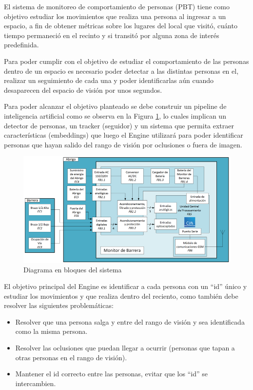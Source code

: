 \documentclass[11pt]{charter}
\begin{document}
El sistema de monitoreo de comportamiento de personas (PBT) tiene como objetivo estudiar los movimientos que realiza una persona al ingresar a un espacio, a fin de obtener métricas sobre los lugares del local que visitó, cuánto tiempo permaneció en el recinto y si transitó por alguna zona de interés predefinida.

Para poder cumplir con el objetivo de estudiar el comportamiento de las personas dentro de un espacio es necesario poder detectar a las distintas personas en el, realizar un seguimiento de cada una y poder identificarlas aún cuando desaparecen del espacio de visión por unos segundos.

Para poder alcanzar el objetivo planteado se debe construir un pipeline de inteligencia artificial como se observa en la Figura \ref{fig:diagBloques}, lo cuales implican un detector de personas, un tracker (seguidor) y un sistema que permita extraer características (embeddings) que luego el Engine utilizará para poder identificar personas que hayan salido del rango de visión por oclusiones o fuera de imagen.

\vspace{25px}

\begin{figure}[htpb]
\centering 
\includegraphics[width=.7\textwidth]{./Figuras/diagBloques.png}
\caption{Diagrama en bloques del sistema}
\label{fig:diagBloques}
\end{figure}

El objetivo principal del Engine es identificar a cada persona con un “id” único y estudiar los movimientos y que realiza dentro del reciento, como también debe resolver las siguientes problemáticas:
\begin{itemize}
\item Resolver que una persona salga y entre del rango de visión y sea identificada como la misma persona.
\item Resolver las oclusiones que puedan llegar a ocurrir (personas que tapan a otras personas en el rango de visión).
\item Mantener el id correcto entre las personas, evitar que los “id” se intercambien.
\end{itemize}
\end{document}
